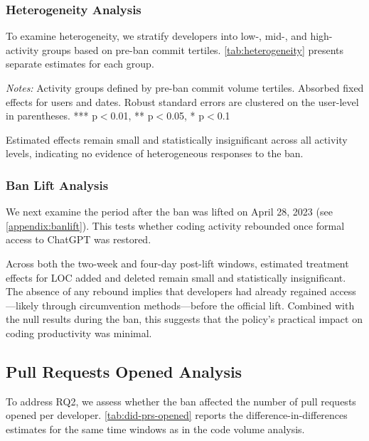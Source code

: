 \subsubsection{Heterogeneity Analysis}

To examine heterogeneity, we stratify developers into low-, mid-, and high-activity groups based on pre-ban commit tertiles. \autoref{tab:heterogeneity} presents separate estimates for each group.

\begin{table}[htbp]
  \centering
  \caption{Heterogeneity Analysis by Developer Activity Level}
  \label{tab:heterogeneity}
  
  \par\vspace{0.1cm}
  \textit{Notes:} Activity groups defined by pre-ban commit volume tertiles. Absorbed fixed effects for users and dates. Robust standard errors are clustered on the user-level in parentheses. *** p$<$0.01, ** p$<$0.05, * p$<$0.1
\end{table}

Estimated effects remain small and statistically insignificant across all activity levels, indicating no evidence of heterogeneous responses to the ban.

\subsubsection{Ban Lift Analysis}

We next examine the period after the ban was lifted on April 28, 2023 (see \autoref{appendix:banlift}). This tests whether coding activity rebounded once formal access to ChatGPT was restored.

Across both the two-week and four-day post-lift windows, estimated treatment effects for LOC added and deleted remain small and statistically insignificant. The absence of any rebound implies that developers had already regained access---likely through circumvention methods---before the official lift. Combined with the null results during the ban, this suggests that the policy's practical impact on coding productivity was minimal.

\subsection{Pull Requests Opened Analysis}

To address RQ2, we assess whether the ban affected the number of pull requests opened per developer. \autoref{tab:did-prs-opened} reports the difference-in-differences estimates for the same time windows as in the code volume analysis.

